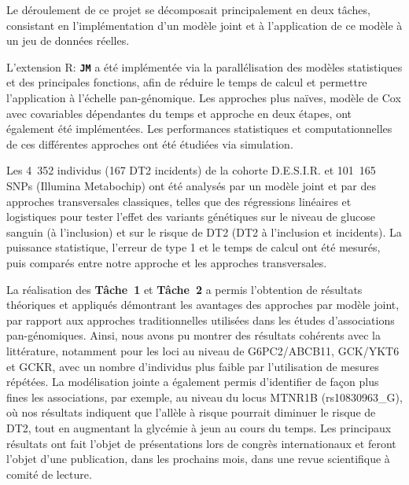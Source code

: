 \documentclass[11pt,a4paper,sans]{moderncv}
\newcommand\cmd[1]{{\texttt{\color{black}\textbf{#1}}}}
\begin{document}
\par{\setlength{\parindent}{0.5cm}
Le déroulement de ce projet se décomposait principalement en deux tâches, consistant en l'implémentation d'un modèle joint et à l'application de ce modèle à un jeu de données réelles.

\begin{description}
    \setlength{\itemsep}{0.5em}
    \item[\textbf{Tâche 1:}] L'extension R: \cmd{JM} \cite{rizopoulos_jm_2010} a été implémentée via la parallélisation des modèles statistiques et des principales fonctions,
        afin de réduire le temps de calcul et permettre l'application à l'échelle pan-génomique. Les approches plus naïves, modèle de Cox avec covariables dépendantes du temps et approche en deux étapes, ont également été implémentées.
        Les performances statistiques et computationnelles de ces différentes approches ont été étudiées via simulation.

    \item[\textbf{Tâche 2:}] Les \mbox{4 352} individus (167 DT2 incidents) de la cohorte D.E.S.I.R.\cite{balkau_epidemiologic_1996} et \mbox{101 165} SNPs (Illumina Metabochip\cite{voight_metabochip_2012}) ont été analysés par un modèle joint et par des approches transversales classiques,
        telles que des régressions linéaires et logistiques pour tester l'effet des variants génétiques sur le niveau de glucose sanguin (à l'inclusion) et sur le risque de DT2 (DT2 à l'inclusion et incidents).
        La puissance statistique, l'erreur de type 1 et le temps de calcul ont été mesurés, puis comparés entre notre approche et les approches transversales.
\end{description}
}
\vspace{0.5em}
\par{\setlength{\parindent}{0.5cm}
La réalisation des \textbf{Tâche~1} et \textbf{Tâche~2} a permis l'obtention de résultats théoriques et appliqués démontrant les avantages des approches par modèle joint, 
par rapport aux approches traditionnelles utilisées dans les études d'associations pan-génomiques.\newline
Ainsi, nous avons pu montrer des résultats cohérents avec la littérature, notamment pour les loci au niveau de G6PC2/ABCB11, GCK/YKT6 et GCKR, avec un nombre d'individus plus faible par l'utilisation de mesures répétées. 
La modélisation jointe a également permis d'identifier de façon plus fines les associations, par exemple, au niveau du locus MTNR1B (rs10830963\_G), où nos résultats indiquent que l'allèle à risque pourrait diminuer le risque de DT2, tout en augmentant la glycémie à jeun au cours du temps.\newline
Les principaux résultats ont fait l'objet de présentations lors de congrès internationaux et feront l'objet d'une publication, dans les prochains mois, dans une revue scientifique à comité de lecture.
}
\end{document}
